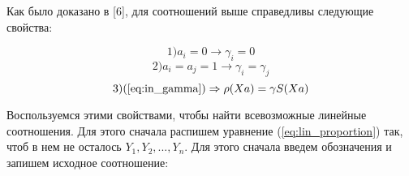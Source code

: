 \documentclass[a4paper,12pt]{extarticle}
\theoremstyle{plain} %
\begin{document}
\begin{large}
Как было доказано в [6], для соотношений выше справедливы следующие свойства:

 \begin{equation} \label{eq:lin_property1} 1) a_i = 0 \rightarrow \gamma_i = 0 \end{equation}
 \begin{equation} \label{eq:lin_property2} 2) a_i = a_j = 1 \rightarrow \gamma_i = \gamma_j  
 \end{equation}
\begin{equation} \label{eq:lin_property3} 3)(\ref{eq:in_gamma}) \Rightarrow \rho (Xa) = \gamma S(Xa) \end{equation}

Воспользуемся этими свойствами, чтобы найти всевозможные линейные соотношения. Для этого сначала распишем уравнение (\ref{eq:lin_proportion}) так, чтоб в нем не осталось $Y_1, Y_2, ..., Y_n$. Для этого сначала введем обозначения и запишем исходное соотношение:


\end{large}
\end{document}
